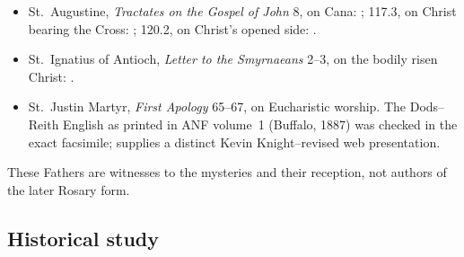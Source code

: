 \begin{itemize}
  \item St.~Augustine, \emph{Tractates on the Gospel of John} 8, on Cana: ; 117.3, on Christ bearing the Cross: ; 120.2, on Christ's opened side: .
  \item St.~Ignatius of Antioch, \emph{Letter to the Smyrnaeans} 2--3, on the bodily risen Christ: .
  \item St.~Justin Martyr, \emph{First Apology} 65--67, on Eucharistic worship. The Dods--Reith English as printed in ANF volume~1 (Buffalo, 1887) was checked in the exact facsimile;  supplies a distinct Kevin Knight--revised web presentation.
\end{itemize}

These Fathers are witnesses to the mysteries and their reception, not authors of the later Rosary form.

\subsection{Historical study}

